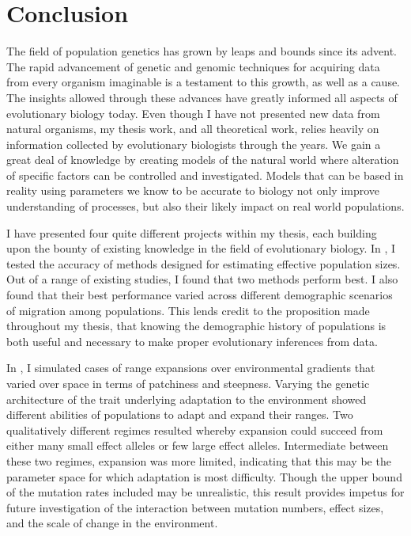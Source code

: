 \chapter{Conclusion}
\label{chap:conclusions}

The field of population genetics has grown by leaps and bounds since its advent. The rapid advancement of genetic and genomic techniques for acquiring data from every organism imaginable is a testament to this growth, as well as a cause. The insights allowed through these advances have greatly informed all aspects of evolutionary biology today. Even though I have not presented new data from natural organisms, my thesis work, and all theoretical work, relies heavily on information collected by evolutionary biologists through the years. We gain a great deal of knowledge by creating models of the natural world where alteration of specific factors can be controlled and investigated. Models that can be based in reality using parameters we know to be accurate to biology not only improve understanding of processes, but also their likely impact on real world populations.

I have presented four quite different projects within my thesis, each building upon the bounty of existing knowledge in the field of evolutionary biology. In , I tested the accuracy of methods designed for estimating effective population sizes. Out of a range of existing studies, I found that two methods perform best. I also found that their best performance varied across different demographic scenarios of migration among populations. This lends credit to the proposition made throughout my thesis, that knowing the demographic history of populations is both useful and necessary to make proper evolutionary inferences from data.

In , I simulated cases of range expansions over environmental gradients that varied over space in terms of patchiness and steepness. Varying the genetic architecture of the trait underlying adaptation to the environment showed different abilities of populations to adapt and expand their ranges. Two qualitatively different regimes resulted whereby expansion could succeed from either many small effect alleles or few large effect alleles. Intermediate between these two regimes, expansion was more limited, indicating that this may be the parameter space for which adaptation is most difficulty. Though the upper bound of the mutation rates included may be unrealistic, this result provides impetus for future investigation of the interaction between mutation numbers, effect sizes, and the scale of change in the environment.

